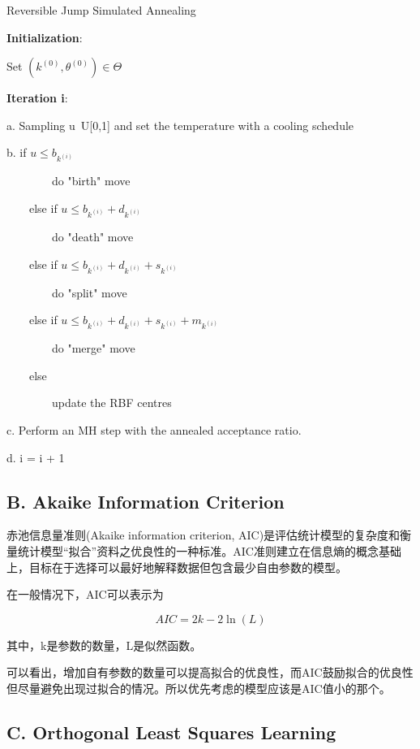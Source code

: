 \documentclass[twocolumn]{article}
\begin{document}
\begin{algorithm}[H]
\caption{Reversible Jump Simulated Annealing}
\textbf{Initialization}:

Set $(k^{(0)}, \theta^{(0)}) \in \Theta$

\textbf{Iteration i}:

a. Sampling u~U[0,1] and set the temperature with a cooling schedule

b. if $u \leq b_{k^{(i)}}$

\ \ \ \ \ \ \ \ do "birth" move

\ \ \ \ else if $u \leq b_{k^{(i)}} + d_{k^{(i)}}$

\ \ \ \ \ \ \ \ do "death" move

\ \ \ \ else if $u \leq b_{k^{(i)}} + d_{k^{(i)}} + s_{k^{(i)}}$

\ \ \ \ \ \ \ \ do "split" move

\ \ \ \ else if $u \leq b_{k^{(i)}} + d_{k^{(i)}} + s_{k^{(i)}} + m_{k^{(i)}}$

\ \ \ \ \ \ \ \ do "merge" move

\ \ \ \ else

\ \ \ \ \ \ \ \ update the RBF centres

c. Perform an MH step with the annealed acceptance ratio.

d. i = i + 1

\end{algorithm}

\subsection*{B. Akaike Information Criterion}

赤池信息量准则(Akaike information criterion, AIC)\cite{1100705}是评估统计模型的复杂度和衡量统计模型“拟合”资料之优良性的一种标准。AIC准则建立在信息熵的概念基础上，目标在于选择可以最好地解释数据但包含最少自由参数的模型。

在一般情况下，AIC可以表示为

$$AIC = 2k - 2\ln(L)$$

其中，k是参数的数量，L是似然函数。

可以看出，增加自有参数的数量可以提高拟合的优良性，而AIC鼓励拟合的优良性但尽量避免出现过拟合的情况。所以优先考虑的模型应该是AIC值小的那个。

\subsection*{C. Orthogonal Least Squares Learning}
\end{document}
